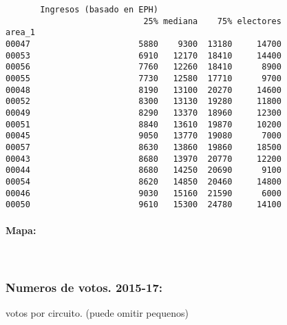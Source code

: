 \documentclass[11pt]{article}
\begin{document}
    \begin{verbatim}
       Ingresos (basado en EPH)                         
                            25% mediana    75% electores
area_1                                                  
00047                      5880    9300  13180     14700
00053                      6910   12170  18410     14400
00056                      7760   12260  18410      8900
00055                      7730   12580  17710      9700
00048                      8190   13100  20270     14600
00052                      8300   13130  19280     11800
00049                      8290   13370  18960     12300
00051                      8840   13610  19870     10200
00045                      9050   13770  19080      7000
00057                      8630   13860  19860     18500
00043                      8680   13970  20770     12200
00044                      8680   14250  20690      9100
00054                      8620   14850  20460     14800
00046                      9030   15160  21590      6000
00050                      9610   15300  24780     14100
    \end{verbatim}

    
    \hypertarget{mapa}{%
\paragraph{Mapa:}\label{mapa}}

    
    \begin{center}
    \end{center}
    { \hspace*{\fill} \\}
    
    \hypertarget{numeros-de-votos.-2015-17}{%
\subsubsection{Numeros de votos.
2015-17:}\label{numeros-de-votos.-2015-17}}

    
    votos por circuito. (puede omitir pequenos)

    
    
\end{document}
